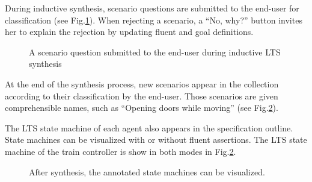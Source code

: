 During inductive synthesis, scenario questions are submitted to the end-user for classification (see Fig.\ref{image:isis-tool-scenario-question}). When rejecting a scenario, a ``No, why?'' button invites her to explain the rejection by updating fluent and goal definitions. 

\begin{figure}[H]
\centering{}
  \caption{A scenario question submitted to the end-user during inductive LTS synthesis\label{image:isis-tool-scenario-question}}
\end{figure}

At the end of the synthesis process, new scenarios appear in the collection according to their classification by the end-user. Those scenarios are given comprehensible names, such as ``Opening doors while moving'' (see Fig.\ref{image:isis-after}). 

The LTS state machine of each agent also appears in the specification outline. State machines can be visualized with or without fluent assertions. The LTS state machine of the train controller is show in both modes in Fig.\ref{image:isis-after}. 

\begin{figure}[H]
\centering{}
  \caption{After synthesis, the annotated state machines can be visualized.\label{image:isis-after}}
\end{figure}

